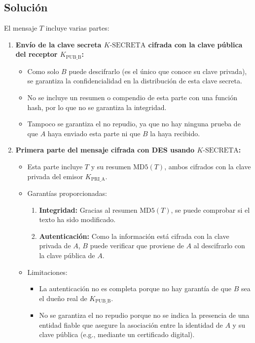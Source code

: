 \documentclass[12pt]{article}
\begin{document}
\subsection{Solución}

El mensaje \(T\) incluye varias partes:

\begin{enumerate}
    \item \textbf{Envío de la clave secreta \(K\text{-SECRETA}\) cifrada con la clave pública del receptor \(K_{\text{PUB\_B}}\):}
    \begin{itemize}
        \item Como solo \(B\) puede descifrarlo (es el único que conoce su clave privada), se garantiza la confidencialidad en la distribución de esta clave secreta.
        \item No se incluye un resumen o compendio de esta parte con una función hash, por lo que no se garantiza la integridad.
        \item Tampoco se garantiza el no repudio, ya que no hay ninguna prueba de que \(A\) haya enviado esta parte ni que \(B\) la haya recibido.
    \end{itemize}

    \item \textbf{Primera parte del mensaje cifrada con DES usando \(K\text{-SECRETA}\):}
    \begin{itemize}
        \item Esta parte incluye \(T\) y su resumen \(\text{MD5}(T)\), ambos cifrados con la clave privada del emisor \(K_{\text{PRI\_A}}\).
        \item Garantías proporcionadas:
        \begin{enumerate}
            \item \textbf{Integridad:} Gracias al resumen \(\text{MD5}(T)\), se puede comprobar si el texto ha sido modificado.
            \item \textbf{Autenticación:} Como la información está cifrada con la clave privada de \(A\), \(B\) puede verificar que proviene de \(A\) al descifrarlo con la clave pública de \(A\).
        \end{enumerate}
        \item Limitaciones:
        \begin{itemize}
            \item La autenticación no es completa porque no hay garantía de que \(B\) sea el dueño real de \(K_{\text{PUB\_B}}\).
            \item No se garantiza el no repudio porque no se indica la presencia de una entidad fiable que asegure la asociación entre la identidad de \(A\) y su clave pública (e.g., mediante un certificado digital).
        \end{itemize}
    \end{itemize}

\end{enumerate}
\end{document}
